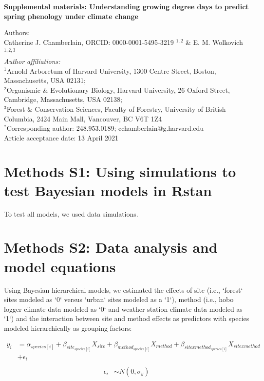\documentclass{article}\usepackage[]{graphicx}\usepackage[]{color}
\begin{document}
\noindent \textbf{\Large{Supplemental materials: Understanding growing degree days to predict spring phenology under climate change}}

\noindent Authors:\\
Catherine J. Chamberlain, ORCID: 0000-0001-5495-3219 $^{1,2}$ \& E. M. Wolkovich $^{1,2,3}$
\vspace{2ex}\\
\emph{Author affiliations:}\\
$^{1}$Arnold Arboretum of Harvard University, 1300 Centre Street, Boston, Massachusetts, USA 02131; \\
$^{2}$Organismic \& Evolutionary Biology, Harvard University, 26 Oxford Street, Cambridge, Massachusetts, USA 02138; \\
$^{3}$Forest \& Conservation Sciences, Faculty of Forestry, University of British Columbia, 2424 Main Mall, Vancouver, BC V6T 1Z4\\
\vspace{2ex}
$^*$Corresponding author: 248.953.0189; cchamberlain@g.harvard.edu\\
\vspace{2ex}
Article acceptance date: 13 April 2021

\renewcommand{\thetable}{S\arabic{table}}
\renewcommand{\thefigure}{S\arabic{figure}}
\renewcommand{\labelitemi}{$-$}



\section*{Methods S1: Using simulations to test Bayesian models in Rstan}
To test all models, we used data simulations. 

\section*{Methods S2: Data analysis and model equations}
Using Bayesian hierarchical models, we estimated the effects of site (i.e., `forest` sites modeled as `0` versus `urban` sites modeled as a `1`), method (i.e., hobo logger climate data modeled as `0` and weather station climate data modeled as `1`) and the interaction between site and method effects as predictors with species modeled hierarchically as grouping factors:

\begin{align*}
y_i &= \alpha_{species[i]} + \beta_{site_{species[i]}}X_{site} + \beta_{method_{species[i]}}X_{method} + \beta_{sitexmethod_{species[i]}}X_{sitexmethod}\\
&+ \epsilon_i \tag{1}\\
\end{align*}
\begin{align*}
\epsilon_i & \sim N(0,\sigma_y) \\
\end{align*}
\end{document}
